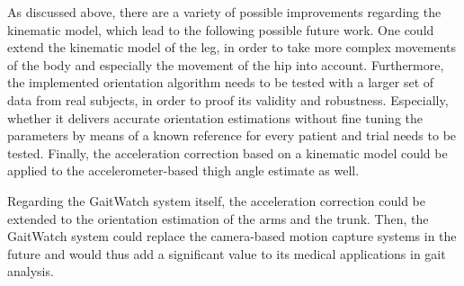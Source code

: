 As discussed above, there are a variety of possible improvements regarding the kinematic model, which lead to the following possible future work. One could extend the kinematic model of the leg, in order to take more complex movements of the body and especially the movement of the hip into account. Furthermore, the implemented orientation algorithm needs to be tested with a larger set of data from real subjects, in order to proof its validity and robustness. Especially, whether it delivers accurate orientation estimations without fine tuning the parameters by means of a known reference for every patient and trial needs to be tested. Finally, the acceleration correction based on a kinematic model could be applied to the accelerometer-based thigh angle estimate as well.

Regarding the GaitWatch system itself, the acceleration correction could be extended to the orientation estimation of the arms and the trunk. Then, the GaitWatch system could replace the camera-based motion capture systems in the future and would thus add a significant value to its medical applications in gait analysis.


